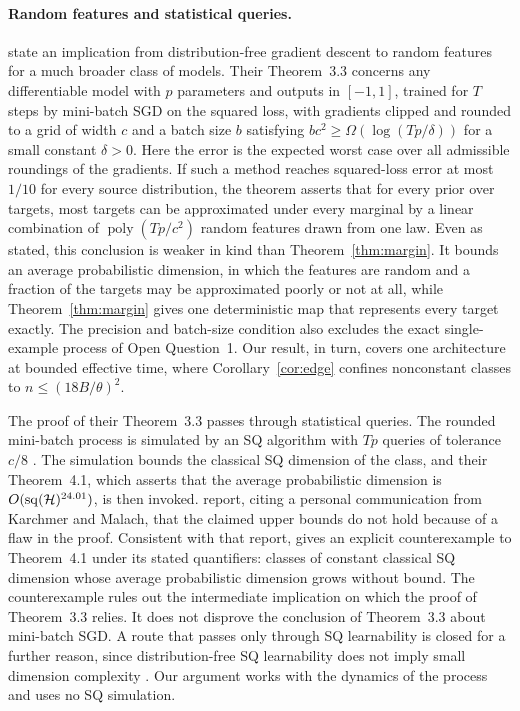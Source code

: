 \documentclass[11pt,letterpaper,pmlr,twoside]{jmlr}
\newcommand{\poly}{\operatorname{poly}}
\begin{document}
\paragraph{Random features and statistical queries.} \citet{KM25} state an implication from distribution-free gradient descent to random features for a much broader class of models. Their Theorem~3.3 concerns any differentiable model with $p$ parameters and outputs in $[-1,1]$, trained for $T$ steps by mini-batch SGD on the squared loss, with gradients clipped and rounded to a grid of width $c$ and a batch size $b$ satisfying $bc^2\ge\Omega(\log(Tp/\delta))$ for a small constant $\delta>0$. Here the error is the expected worst case over all admissible roundings of the gradients. If such a method reaches squared-loss error at most $1/10$ for every source distribution, the theorem asserts that for every prior over targets, most targets can be approximated under every marginal by a linear combination of $\poly(Tp/c^2)$ random features drawn from one law. Even as stated, this conclusion is weaker in kind than Theorem~\ref{thm:margin}. It bounds an average probabilistic dimension, in which the features are random and a fraction of the targets may be approximated poorly or not at all, while Theorem~\ref{thm:margin} gives one deterministic map that represents every target exactly. The precision and batch-size condition also excludes the exact single-example process of Open Question~1. Our result, in turn, covers one architecture at bounded effective time, where Corollary~\ref{cor:edge} confines nonconstant classes to $n\le(18B/\theta)^2$.

The proof of their Theorem~3.3 passes through statistical queries. The rounded mini-batch process is simulated by an SQ algorithm with $Tp$ queries of tolerance $c/8$ \citep[Theorem~3.4, due to \citealt{Abbe21}]{KM25}. The simulation bounds the classical SQ dimension of the class, and their Theorem~4.1, which asserts that the average probabilistic dimension is $O(\operatorname{sq}(\mathcal H)^{24.01})$, is then invoked. \citet{FKS26} report, citing a personal communication from Karchmer and Malach, that the claimed upper bounds do not hold because of a flaw in the proof. Consistent with that report, \citet{MausbergSQ26} gives an explicit counterexample to Theorem~4.1 under its stated quantifiers: classes of constant classical SQ dimension whose average probabilistic dimension grows without bound. The counterexample rules out the intermediate implication on which the proof of Theorem~3.3 relies. It does not disprove the conclusion of Theorem~3.3 about mini-batch SGD. A route that passes only through SQ learnability is closed for a further reason, since distribution-free SQ learnability does not imply small dimension complexity \citep{Patel26,MausbergSQ26}. Our argument works with the dynamics of the process and uses no SQ simulation.
\end{document}

